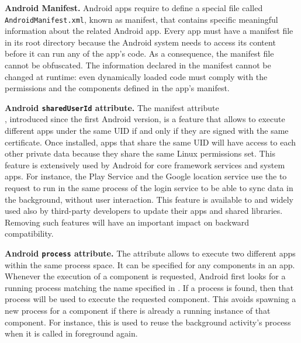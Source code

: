 \textbf{Android Manifest.} Android apps require to define a special file called \texttt{AndroidManifest.xml}, known as manifest\cite{manifest}, that contains specific meaningful information about the related Android app. Every app must have a manifest file in its root directory because the Android system needs to access its content before it can run any of the app's code. As a consequence, the manifest file cannot be obfuscated. The information declared in the manifest  cannot be changed at runtime: even  dynamically loaded code must comply with the permissions and the components defined in the app's manifest.

\textbf{Android \texttt{sharedUserId} attribute.} The manifest attribute \\ \shared, introduced since the first Android version, is a feature that allows to execute different apps under the same UID if and only if they are signed with the same certificate. Once installed, apps that share the same UID will have access to each other private data because they share the same Linux permissions set. This feature is extensively used by Android for core framework services and system apps. For instance, the Play Service and the Google location service use the \shared to request to run in the same process of the login service to be able to sync data in the background, without  user interaction. This feature is available to and widely used also by third-party developers to update their apps and shared libraries. Removing such features will have  an important impact on backward compatibility.
  
\textbf{Android \texttt{process} attribute.} The attribute \proc allows to execute two different apps within the same process space. It can be specified for any components in an app. Whenever the execution of  a component is requested, Android first looks for a running process matching the name specified in \proc. If a process is found, then that process will be used to execute the requested component. This avoids spawning a new process for a component if there is already a running instance of that component. For instance, this is used to reuse the background activity's process when it is called in foreground again.